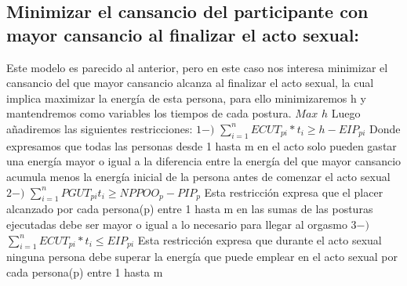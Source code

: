 \documentclass{llncs}
\begin{document}
\subsection{Minimizar el cansancio del participante con mayor cansancio al finalizar el acto sexual:}
Este modelo es parecido al anterior, pero en este caso nos interesa minimizar el cansancio del que mayor cansancio alcanza al finalizar el acto sexual, la cual implica maximizar la energía de esta persona, para ello minimizaremos h y mantendremos como variables los tiempos de cada postura.
\newline
\newline
$Max$ $h$
\newline
\newline
Luego añadiremos las siguientes restricciones:
\newline
\newline
$1-)$ $\sum_{i=1}^{n} ECUT_{pi}*t_{i} \geq h - EIP_{pi}$
\newline
\newline
Donde expresamos que todas las personas desde 1 hasta m en el acto solo pueden gastar una energía mayor o igual a la diferencia entre la energía del que mayor cansancio acumula menos la energía inicial de la persona antes de comenzar el acto sexual
\newline
\newline
$2-)$ $\sum_{i=1}^{n} PGUT_{pi}t_{i} \geq NPPOO_{p} - PIP_{p}$
\newline
\newline
Esta restricción expresa que el placer alcanzado por cada persona(p) entre 1 hasta m en las sumas de las posturas ejecutadas debe ser mayor o igual a lo necesario para llegar al orgasmo
\newline
\newline
$3-)$ $\sum_{i=1}^{n} ECUT_{pi}*t_{i} \leq EIP_{pi}$
\newline
\newline
Esta restricción expresa que durante el acto sexual ninguna persona debe superar la energía que puede emplear en el acto sexual por cada persona(p) entre 1 hasta m
\end{document}
